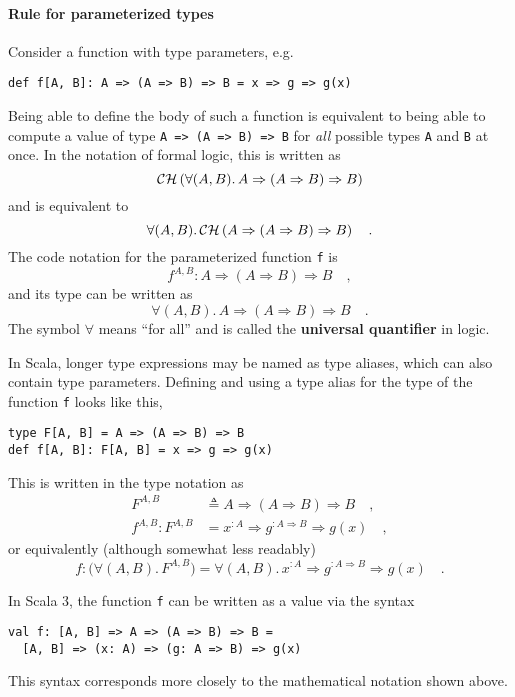 \paragraph{Rule for parameterized types}

Consider a function with type parameters, e.g.
\begin{lstlisting}
def f[A, B]: A => (A => B) => B = x => g => g(x)
\end{lstlisting}
Being able to define the body of such a function is equivalent to
being able to compute a value of type \lstinline!A => (A => B) => B!
for \emph{all} possible types \lstinline!A!
and \lstinline!B! at once.
In the notation of formal logic, this is written as
\[
{\cal CH}\left(\forall(A,B).\,A\Rightarrow(A\Rightarrow B)\Rightarrow B\right)
\]
and is equivalent to
\[
\forall(A,B).\,{\cal CH}\left(A\Rightarrow(A\Rightarrow B)\Rightarrow B\right)\quad.
\]
 The code notation for the parameterized function \lstinline!f!
is 
\[
f^{A,B}:A\Rightarrow\left(A\Rightarrow B\right)\Rightarrow B\quad,
\]
and its type can be written as
\[
\forall(A,B).\,A\Rightarrow\left(A\Rightarrow B\right)\Rightarrow B\quad.
\]
The symbol $\forall$ means ``for all'' and is called the \textbf{universal
quantifier} in logic.

In Scala, longer type expressions may be named as type aliases, which
can also contain type parameters. Defining and using a type alias
for the type of the function \lstinline!f!
looks like this,
\begin{lstlisting}
type F[A, B] = A => (A => B) => B
def f[A, B]: F[A, B] = x => g => g(x)
\end{lstlisting}
This is written in the type notation as
\begin{align*}
F^{A,B} & \triangleq A\Rightarrow\left(A\Rightarrow B\right)\Rightarrow B\quad,\\
f^{A,B}:F^{A,B} & =x^{:A}\Rightarrow g^{:A\Rightarrow B}\Rightarrow g(x)\quad,
\end{align*}
or equivalently (although somewhat less readably)
\[
f:\big(\forall(A,B).\,F^{A,B}\big)=\forall(A,B).\,x^{:A}\Rightarrow g^{:A\Rightarrow B}\Rightarrow g(x)\quad.
\]

In Scala 3, the function \lstinline!f!
can be written as a value via the syntax
\begin{lstlisting}
val f: [A, B] => A => (A => B) => B =
  [A, B] => (x: A) => (g: A => B) => g(x)
\end{lstlisting}
This syntax corresponds more closely to the mathematical notation
shown above.

